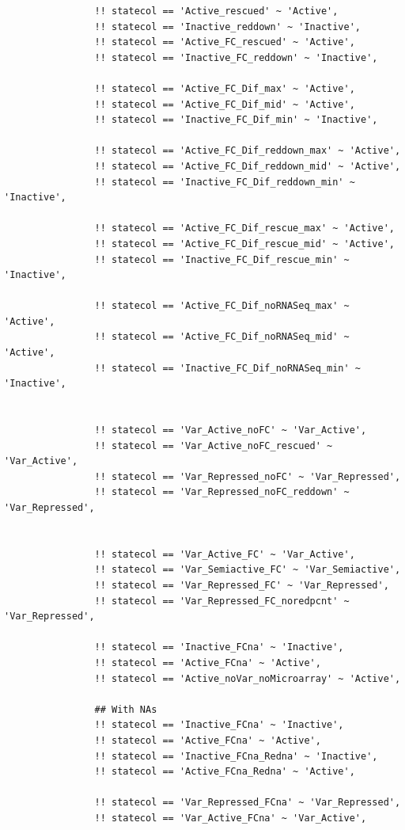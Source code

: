 \documentclass[11pt]{article}
\begin{document}
\begin{verbatim}
                !! statecol == 'Active_rescued' ~ 'Active',
                !! statecol == 'Inactive_reddown' ~ 'Inactive',
                !! statecol == 'Active_FC_rescued' ~ 'Active',
                !! statecol == 'Inactive_FC_reddown' ~ 'Inactive',

                !! statecol == 'Active_FC_Dif_max' ~ 'Active',
                !! statecol == 'Active_FC_Dif_mid' ~ 'Active',
                !! statecol == 'Inactive_FC_Dif_min' ~ 'Inactive',

                !! statecol == 'Active_FC_Dif_reddown_max' ~ 'Active',
                !! statecol == 'Active_FC_Dif_reddown_mid' ~ 'Active',
                !! statecol == 'Inactive_FC_Dif_reddown_min' ~ 'Inactive',

                !! statecol == 'Active_FC_Dif_rescue_max' ~ 'Active',
                !! statecol == 'Active_FC_Dif_rescue_mid' ~ 'Active',
                !! statecol == 'Inactive_FC_Dif_rescue_min' ~ 'Inactive',

                !! statecol == 'Active_FC_Dif_noRNASeq_max' ~ 'Active',
                !! statecol == 'Active_FC_Dif_noRNASeq_mid' ~ 'Active',
                !! statecol == 'Inactive_FC_Dif_noRNASeq_min' ~ 'Inactive',


                !! statecol == 'Var_Active_noFC' ~ 'Var_Active',
                !! statecol == 'Var_Active_noFC_rescued' ~ 'Var_Active',
                !! statecol == 'Var_Repressed_noFC' ~ 'Var_Repressed',
                !! statecol == 'Var_Repressed_noFC_reddown' ~ 'Var_Repressed',


                !! statecol == 'Var_Active_FC' ~ 'Var_Active',
                !! statecol == 'Var_Semiactive_FC' ~ 'Var_Semiactive',
                !! statecol == 'Var_Repressed_FC' ~ 'Var_Repressed',
                !! statecol == 'Var_Repressed_FC_noredpcnt' ~ 'Var_Repressed',

                !! statecol == 'Inactive_FCna' ~ 'Inactive',
                !! statecol == 'Active_FCna' ~ 'Active',
                !! statecol == 'Active_noVar_noMicroarray' ~ 'Active',

                ## With NAs
                !! statecol == 'Inactive_FCna' ~ 'Inactive',
                !! statecol == 'Active_FCna' ~ 'Active',
                !! statecol == 'Inactive_FCna_Redna' ~ 'Inactive',
                !! statecol == 'Active_FCna_Redna' ~ 'Active',

                !! statecol == 'Var_Repressed_FCna' ~ 'Var_Repressed',
                !! statecol == 'Var_Active_FCna' ~ 'Var_Active',


\end{verbatim}
\end{document}
